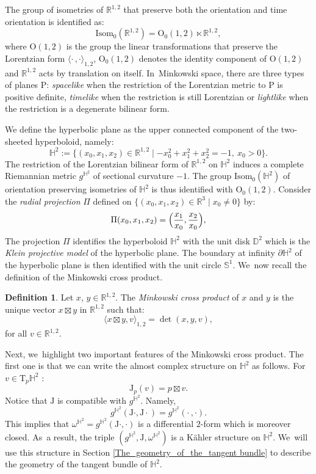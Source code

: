 \documentclass[11pt]{article}
\theoremstyle{plain}
\theoremstyle{definition}
\newtheorem{defi}[cor]{Definition}
\newcommand{\minko}{\mathbb{R}^{1,2}}
\newcommand{\isom}{\mathrm{Isom}_0}
\newcommand{\J}{\mathrm{J}}
\newcommand{\inner}[1] {\langle #1 \rangle}
\newcommand{\inners}{\langle \cdot\,, \cdot \rangle}
\begin{document}
The group of isometries of $\minko$ that preserve both the orientation and time orientation is identified as:
\[
\mathrm{Isom}_0(\minko)=\mathrm{O}_0(1,2)\ltimes\minko,
\]
where $\mathrm{O}(1,2)$ is the group the linear transformations that preserve the Lorentzian form $\inners_{1,2}$, $\mathrm{O}_0(1,2)$ denotes the identity component of $\mathrm{O}(1,2)$ and $\minko$ acts by translation on itself. In~Minkowski space, there are three types of planes $\mathrm{P}$: \emph{spacelike} when the restriction of the Lorentzian metric to $\mathrm{P}$ is positive definite, \emph{timelike} when the restriction is still Lorentzian or \emph{lightlike} when the restriction is a degenerate bilinear form.

We define the hyperbolic plane as the upper connected component of the two-sheeted hyperboloid,
namely:
\begin{equation}\label{hyperboloid}
\mathbb{H}^2:=\{(x_0,x_1,x_2)\in \mathbb{R}^{1,2}\mid -x_0^2+x_1^2+x_2^2=-1, \ x_0>0\}.
\end{equation}
The restriction of the Lorentzian bilinear form of $\minko$ on $\mathbb{H}^2$ induces a complete Riemannian metric $g^{\mathbb{H}^2}$ of sectional curvature $-1$. The group $\isom(\mathbb{H}^2)$ of orientation preserving isometries of $\mathbb{H}^2$ is thus identified with $\mathrm{O}_0(1,2)$. Consider the \emph{radial projection} $\Pi$ defined on $\{(x_0,x_1,x_2)\in\mathbb{R}^3\mid x_0\neq 0\}$ by:
\begin{equation}\label{radial}
\Pi(x_0,x_1,x_2)=\Bigl(\frac{x_1}{x_0},\frac{x_2}{x_0} \Bigr),
\end{equation}
The projection $\Pi$ identifies the hyperboloid $\mathbb{H}^2$ with the unit disk $\mathbb{D}^2$ which is the \emph{Klein projective model} of the hyperbolic plane. The boundary at infinity $\partial\mathbb{H}^2$ of the hyperbolic plane is then identified with the unit circle $\mathbb{S}^1$. We~now recall the definition of the Minkowski cross product.
\begin{defi}
Let $x$, $y\in \minko$. The \emph{Minkowski cross product} of $x$ and $y$ is the unique vector $x\boxtimes y$ in $\minko$ such that:
\[
\inner{x\boxtimes y,v}_{1,2}=\det(x,y,v),
\]
for all $v\in \minko$.
\end{defi}
Next, we~highlight two important features of the Minkowski cross product. The first one is that we can write the almost complex structure on $\mathbb{H}^2$ as follows. For $v\in\mathrm{T}_p\mathbb{H}^2$ :
\begin{equation}\label{complex_structure_H2}
\J_p(v)=p\boxtimes v.
\end{equation}
Notice that $\J$ is compatible with $g^{\mathbb{H}^2}$. Namely,
\[
g^{\mathbb{H}^2}(\J\cdot,\J\cdot)=g^{\mathbb{H}^2}(\cdot\,,\cdot).
\]
This implies that $\omega^{\mathbb{H}^2}=g^{\mathbb{H}^2}(\J\cdot,\cdot)$ is a differential $2$-form which is moreover closed. As~a result, the triple $(g^{\mathbb{H}^2}, \J, \omega^{\mathbb{H}^2})$ is a Kähler structure on $\mathbb{H}^2$. We~will use this structure in Section \ref{The_geometry_of_the_tangent bundle} to describe the geometry of the tangent bundle of $\mathbb{H}^2$.
\end{document}
